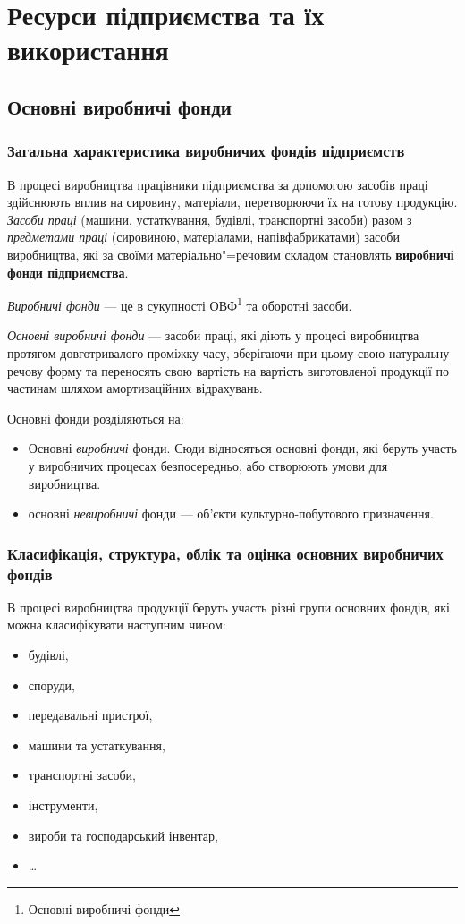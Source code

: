 \documentclass[a5paper,10pt,notitlepage,pdftex,headsepline]{scrartcl}
\begin{document}
\section{Ресурси підприємства та їх використання}
  \subsection{Основні виробничі фонди}
    \subsubsection{Загальна характеристика виробничих фондів підприємств}
      В процесі виробництва працівники підприємства за допомогою засобів праці
      здійснюють вплив на сировину, матеріали, перетворюючи їх на готову
      продукцію.
      \emph{Засоби праці} (машини, устаткування, будівлі, транспортні засоби)
      разом з \emph{предметами праці} (сировиною, матеріалами,
      напівфабрикатами) засоби виробництва, які за своїми матеріально"=речовим
      складом становлять \textbf{виробничі фонди підприємства}.

      \emph{Виробничі фонди} --- це в сукупності ОВФ\footnote{Основні
      виробничі фонди} та оборотні засоби.

      \emph{Основні виробничі фонди} --- засоби праці, які діють у процесі
      виробництва протягом довготривалого проміжку часу, зберігаючи при цьому
      свою натуральну речову форму та переносять свою вартість на вартість
      виготовленої продукції по частинам шляхом амортизаційних відрахувань.

      Основні фонди розділяються на:
      \begin{itemize}
        \item Основні \emph{виробничі} фонди.
          Сюди відносяться основні фонди, які беруть участь у виробничих
          процесах безпосередньо, або створюють умови для виробництва.
        \item основні \emph{невиробничі} фонди --- об’єкти
          культурно-побутового призначення.
      \end{itemize}
    \subsubsection{Класифікація, структура, облік та оцінка основних
      виробничих фондів}
      В процесі виробництва продукції беруть участь різні групи основних
      фондів, які можна класифікувати наступним чином:
      \begin{itemize}
        \item будівлі,
        \item споруди,
        \item передавальні пристрої,
        \item машини та устаткування,
        \item транспортні засоби,
        \item інструменти,
        \item вироби та господарський інвентар,
        \item \ldots
      \end{itemize}
\end{document}
